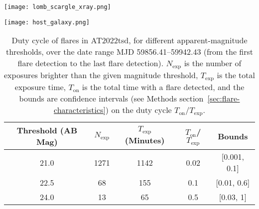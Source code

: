 \documentclass{nature_plusfigure}
\newcommand{\at}{AT2022tsd}
\newcommand{\arcsec}{$^{\prime\prime}$}
\begin{document}
\begin{extended_data}
\begin{figure*}[!ht]
    \centering
    \texttt{[image: lomb\_scargle\_xray.png]}
    \caption{Lomb-Scargle periodogram of the first four epochs of Chandra X-ray observations. The horizontal line shows the power expected for a false-alarm peak (with false alarm probability 2.5\%) under the assumption that there is no periodicity present in the data, using a bootstrap simulation. The observed peaks arise from the 500\,s sampling and aliases (marked with vertical dotted lines).}
    \label{fig:xray-periodogram}
\end{figure*}

\begin{figure*}[!ht]
    \centering
    \texttt{[image: host\_galaxy.png]}
    \caption{\emph{Left:} The position of \at\ within its host galaxy ($r$-band image from Pan-STARRS). The transient is $\approx1.4$\arcsec\ from the center of the galaxy, which corresponds to $9\,$kpc at the redshift of the galaxy. \emph{Right:} The host galaxy of \at\ in the mass-SFR diagram for transient host galaxies\cite{Taggart2021}, including core-collapse supernovae\cite{Taggart2021}, long-duration $\gamma$-ray bursts\cite{Taggart2021}, and LFBOTs\cite{Perley2019,Ho2020_Koala,Coppejans2020,Perley2021,Yao2022}. }
    \label{fig:host-galaxy}
\end{figure*}

\begin{table}
\begin{center}
\caption{Duty cycle of flares in \at, for different apparent-magnitude thresholds, over the date range MJD 59856.41--59942.43 (from the first flare detection to the last flare detection). $N_\mathrm{exp}$ is the number of exposures brighter than the given magnitude threshold, $T_\mathrm{exp}$ is the total exposure time, $T_\mathrm{on}$ is the total time with a flare detected, and the bounds are confidence intervals (see Methods section~\ref{sec:flare-characteristics}) on the duty cycle $T_\mathrm{on}/T_\mathrm{exp}$. }
\label{tab:flare-stats}
\begin{tabular}{ccccc} 
\hline\hline
Threshold (AB Mag) & $N_\mathrm{exp}$ & $T_\mathrm{exp}$ (Minutes) & $T_\mathrm{on}$/$T_\mathrm{exp}$ & Bounds \\
\hline
21.0 & 1271 & 1142 & 0.02 & [0.001, 0.1] \\
22.5 & 68 & 155 & 0.1 & [0.01, 0.6]  \\
24.0 & 13 & 65 & 0.5 & [0.03, 1] \\
\hline
\end{tabular}
\end{center}
\end{table}


\end{extended_data}
\end{document}
